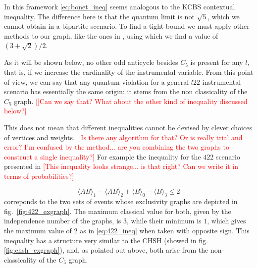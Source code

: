 \documentclass[letterpaper]{article}
\newcommand{\avg}[1]{\langle#1\rangle}
\begin{document}
In this framework \eqref{eq:bonet_ineq} seems analogous to the KCBS contextual
inequality\cite{kcbs2008}.
The difference here is that the quantum limit is not $\sqrt{5}$, which we cannot
obtain in a bipartite scenario.
To find a tight bound we must apply other methods to our graph, like the ones in
\cite{rabelo2014}, using which we find a value of $(3+\sqrt{2})/2$.

As it will be shown below, no other odd anticycle besides
$C_5$ is present for any $l$, that is, if we increase the cardinality of the instrumental variable. From this point of view, we can say that any quantum violation for a general $l22$ instrumental scenario has essentially the
same origin: it stems from the non classicality of the $C_5$ graph. \textcolor{red}{[]Can we say that? What about the other kind of inequality discussed below?]}

This does not mean that different inequalities cannot be devised by clever choices of vertices and weights. \textcolor{red}{[]Is there any algorithm for that? Or is really trial and error? I'm confused by the method... are you combining the two graphs to construct a single inequality?]}
For example the inequality for the $422$ scenario presented in \textcolor{red}{[This inequality looks strange... is that right? Can we write it in terms of probabilities?]}

\cite{rand_internal_report}
\begin{equation}
    \avg{AB}_1 -  \avg{AB}_2 + \avg{B}_0 - \avg{B}_3 \le 2
    \label{eq:422_ineq}
\end{equation}
correponds to the two sets of events whose
exclusivity graphs are depicted in fig.~\ref{fig:422_exgraph}.
The maximum classical value for both, given by the independence number of the
graphs, is $3$, while their minimum is $1$, which gives the maximum value of $2$
as in \eqref{eq:422_ineq} when taken with opposite sign.
This inequality has a structure very similar to the CHSH (showed in
fig.\ref{fig:chsh_exgraph}), and, as pointed out above, both arise from the
non-classicality of the $C_5$ graph.
\end{document}
